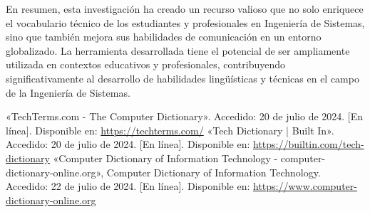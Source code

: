 En resumen, esta investigación ha creado un recurso valioso que no solo enriquece el vocabulario técnico de los estudiantes y profesionales en Ingeniería de Sistemas, sino que también mejora sus habilidades de comunicación en un entorno globalizado. La herramienta desarrollada tiene el potencial de ser ampliamente utilizada en contextos educativos y profesionales, contribuyendo significativamente al desarrollo de habilidades lingüísticas y técnicas en el campo de la Ingeniería de Sistemas.

\clearpage
\begin{thebibliography}{X}
     «TechTerms.com - The Computer Dictionary». Accedido: 20 de julio de 2024. [En línea]. Disponible en: \url{https://techterms.com/}
     «Tech Dictionary | Built In». Accedido: 20 de julio de 2024. [En línea]. Disponible en: \url{https://builtin.com/tech-dictionary}
     «Computer Dictionary of Information Technology - computer-dictionary-online.org», Computer Dictionary of Information Technology. Accedido: 22 de julio de 2024. [En línea]. Disponible en: \url{https://www.computer-dictionary-online.org}

\end{thebibliography}
